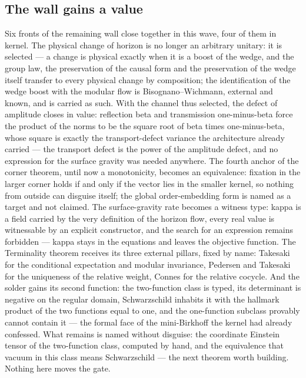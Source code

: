 \documentclass[11pt]{article}
\theoremstyle{definition}\newtheorem{deriv}{Derivation}
\begin{document}
\subsection*{The wall gains a value}Six fronts of the remaining wall close together in this wave, four of them in kernel. The physical change of horizon is no longer an arbitrary unitary: it is selected --- a change is physical exactly when it is a boost of the wedge, and the group law, the preservation of the causal form and the preservation of the wedge itself transfer to every physical change by composition; the identification of the wedge boost with the modular flow is Bisognano--Wichmann, external and known, and is carried as such. With the channel thus selected, the defect of amplitude closes in value: reflection beta and transmission one-minus-beta force the product of the norms to be the square root of beta times one-minus-beta, whose square is exactly the transport-defect variance the architecture already carried --- the transport defect is the power of the amplitude defect, and no expression for the surface gravity was needed anywhere. The fourth anchor of the corner theorem, until now a monotonicity, becomes an equivalence: fixation in the larger corner holds if and only if the vector lies in the smaller kernel, so nothing from outside can disguise itself; the global order-embedding form is named as a target and not claimed. The surface-gravity rate becomes a witness type: kappa is a field carried by the very definition of the horizon flow, every real value is witnessable by an explicit constructor, and the search for an expression remains forbidden --- kappa stays in the equations and leaves the objective function. The Terminality theorem receives its three external pillars, fixed by name: Takesaki for the conditional expectation and modular invariance, Pedersen and Takesaki for the uniqueness of the relative weight, Connes for the relative cocycle. And the solder gains its second function: the two-function class is typed, its determinant is negative on the regular domain, Schwarzschild inhabits it with the hallmark product of the two functions equal to one, and the one-function subclass provably cannot contain it --- the formal face of the mini-Birkhoff the kernel had already confessed. What remains is named without disguise: the coordinate Einstein tensor of the two-function class, computed by hand, and the equivalence that vacuum in this class means Schwarzschild --- the next theorem worth building. Nothing here moves the gate.
\end{document}
